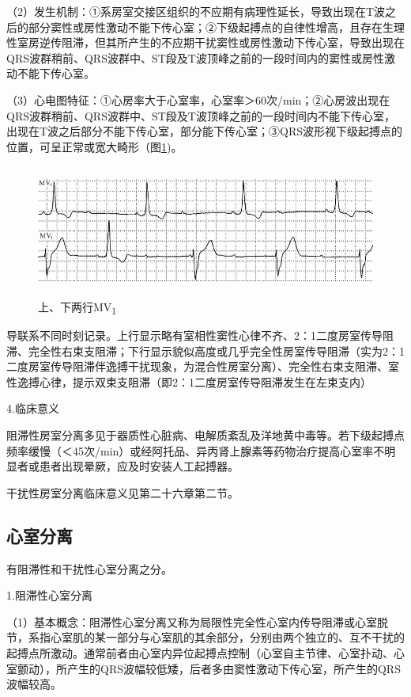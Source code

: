 （2）发生机制：①系房室交接区组织的不应期有病理性延长，导致出现在T波之后的部分窦性或房性激动不能下传心室；②下级起搏点的自律性增高，且存在生理性室房逆传阻滞，但其所产生的不应期干扰窦性或房性激动下传心室，导致出现在QRS波群稍前、QRS波群中、ST段及T波顶峰之前的一段时间内的窦性或房性激动不能下传心室。

（3）心电图特征：①心房率大于心室率，心室率＞60次/min；②心房波出现在QRS波群稍前、QRS波群中、ST段及T波顶峰之前的一段时间内不能下传心室，出现在T波之后部分不能下传心室，部分能下传心室；③QRS波形视下级起搏点的位置，可呈正常或宽大畸形（图\ref{fig30-4})。

\begin{figure}[!htbp]
 \centering
 \includegraphics[width=5.58333in,height=1.70833in]{./images/Image00499.jpg}
 \captionsetup{justification=centering}
 \caption{上、下两行MV\textsubscript{1}}
 \label{fig30-4}
  \end{figure} 
导联系不同时刻记录。上行显示略有室相性窦性心律不齐、2：1二度房室传导阻滞、完全性右束支阻滞；下行显示貌似高度或几乎完全性房室传导阻滞（实为2：1二度房室传导阻滞伴逸搏干扰现象，为混合性房室分离）、完全性右束支阻滞、室性逸搏心律，提示双束支阻滞（即2：1二度房室传导阻滞发生在左束支内）

4.临床意义

阻滞性房室分离多见于器质性心脏病、电解质紊乱及洋地黄中毒等。若下级起搏点频率缓慢（＜45次/min）或经阿托品、异丙肾上腺素等药物治疗提高心室率不明显者或患者出现晕厥，应及时安装人工起搏器。

干扰性房室分离临床意义见第二十六章第二节。

\protect\hypertarget{text00037.htmlux5cux23subid434}{}{}

\subsection{心室分离}

有阻滞性和干扰性心室分离之分。

1.阻滞性心室分离

（1）基本概念：阻滞性心室分离又称为局限性完全性心室内传导阻滞或心室脱节，系指心室肌的某一部分与心室肌的其余部分，分别由两个独立的、互不干扰的起搏点所激动。通常前者由心室内异位起搏点控制（心室自主节律、心室扑动、心室颤动），所产生的QRS波幅较低矮，后者多由窦性激动下传心室，所产生的QRS波幅较高。

